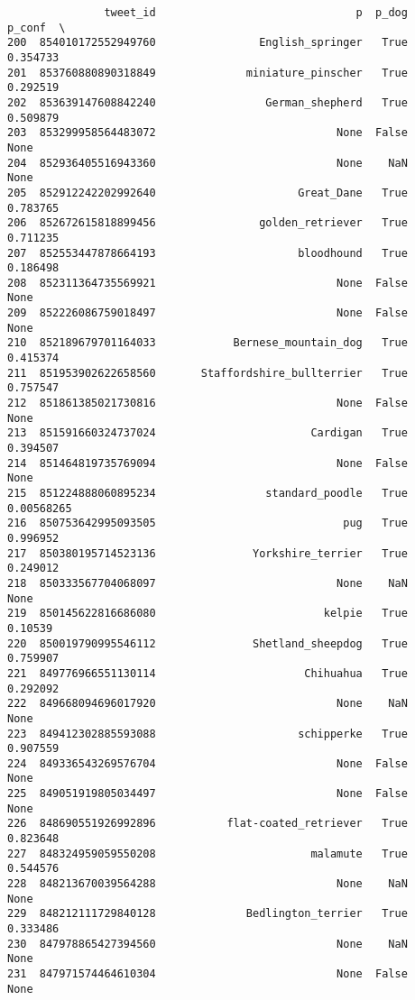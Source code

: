 \documentclass[11pt]{article}
\begin{document}
    
    \begin{verbatim}
               tweet_id                               p  p_dog      p_conf  \
200  854010172552949760                English_springer   True    0.354733   
201  853760880890318849              miniature_pinscher   True    0.292519   
202  853639147608842240                 German_shepherd   True    0.509879   
203  853299958564483072                            None  False        None   
204  852936405516943360                            None    NaN        None   
205  852912242202992640                      Great_Dane   True    0.783765   
206  852672615818899456                golden_retriever   True    0.711235   
207  852553447878664193                      bloodhound   True    0.186498   
208  852311364735569921                            None  False        None   
209  852226086759018497                            None  False        None   
210  852189679701164033            Bernese_mountain_dog   True    0.415374   
211  851953902622658560       Staffordshire_bullterrier   True    0.757547   
212  851861385021730816                            None  False        None   
213  851591660324737024                        Cardigan   True    0.394507   
214  851464819735769094                            None  False        None   
215  851224888060895234                 standard_poodle   True  0.00568265   
216  850753642995093505                             pug   True    0.996952   
217  850380195714523136               Yorkshire_terrier   True    0.249012   
218  850333567704068097                            None    NaN        None   
219  850145622816686080                          kelpie   True     0.10539   
220  850019790995546112               Shetland_sheepdog   True    0.759907   
221  849776966551130114                       Chihuahua   True    0.292092   
222  849668094696017920                            None    NaN        None   
223  849412302885593088                      schipperke   True    0.907559   
224  849336543269576704                            None  False        None   
225  849051919805034497                            None  False        None   
226  848690551926992896           flat-coated_retriever   True    0.823648   
227  848324959059550208                        malamute   True    0.544576   
228  848213670039564288                            None    NaN        None   
229  848212111729840128              Bedlington_terrier   True    0.333486   
230  847978865427394560                            None    NaN        None   
231  847971574464610304                            None  False        None   

\end{verbatim}
\end{document}
